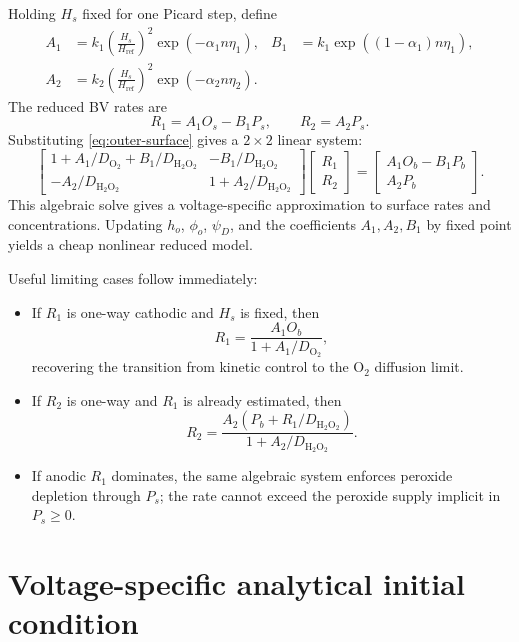 \documentclass[11pt]{article}
\newcommand{\OO}{\mathrm{O}_2}
\newcommand{\PP}{\mathrm{H}_2\mathrm{O}_2}
\begin{document}
Holding \(H_s\) fixed for one Picard step, define
\begin{align}
  A_1 &=
  k_1
  \left(\frac{H_s}{H_{\mathrm{ref}}}\right)^2
  \exp(-\alpha_1 n\eta_1),
  &
  B_1 &=
  k_1\exp((1-\alpha_1)n\eta_1), \\
  A_2 &=
  k_2
  \left(\frac{H_s}{H_{\mathrm{ref}}}\right)^2
  \exp(-\alpha_2 n\eta_2).
\end{align}
The reduced BV rates are
\[
  R_1 = A_1O_s-B_1P_s,
  \qquad
  R_2 = A_2P_s.
\]
Substituting \eqref{eq:outer-surface} gives a \(2\times 2\) linear system:
\begin{equation}
\begin{bmatrix}
1 + A_1/D_{\OO} + B_1/D_{\PP} & -B_1/D_{\PP} \\
-A_2/D_{\PP}                  & 1 + A_2/D_{\PP}
\end{bmatrix}
\begin{bmatrix} R_1 \\ R_2 \end{bmatrix}
=
\begin{bmatrix}
A_1O_b-B_1P_b \\
A_2P_b
\end{bmatrix}.
\label{eq:two-rate-system}
\end{equation}
This algebraic solve gives a voltage-specific approximation to surface rates
and concentrations. Updating \(h_o\), \(\phi_o\), \(\psi_D\), and the
coefficients \(A_1,A_2,B_1\) by fixed point yields a cheap nonlinear reduced
model.

Useful limiting cases follow immediately:
\begin{itemize}
  \item If \(R_1\) is one-way cathodic and \(H_s\) is fixed, then
        \[
          R_1 = \frac{A_1O_b}{1+A_1/D_{\OO}},
        \]
        recovering the transition from kinetic control to the \(\OO\)
        diffusion limit.
  \item If \(R_2\) is one-way and \(R_1\) is already estimated, then
        \[
          R_2 =
          \frac{A_2(P_b+R_1/D_{\PP})}{1+A_2/D_{\PP}}.
        \]
  \item If anodic \(R_1\) dominates, the same algebraic system enforces
        peroxide depletion through \(P_s\); the rate cannot exceed the
        peroxide supply implicit in \(P_s\ge 0\).
\end{itemize}

\section{Voltage-specific analytical initial condition}
\end{document}
